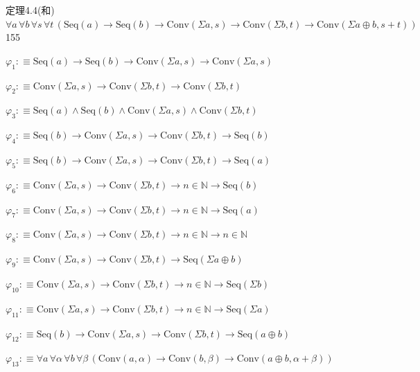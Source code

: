 \begin{fullproof}{定理4.4(和)}{$\forall a\,\forall b\,\forall s\,\forall t\,(\mathrm{Seq}(a) \to \mathrm{Seq}(b) \to \mathrm{Conv}(\Sigma a,s) \to \mathrm{Conv}(\Sigma b,t) \to \mathrm{Conv}(\Sigma a \oplus b,s + t))$}{155}
\begin{ptree}
\end{ptree}
\begin{abbrevlist}
\item $\varphi_{1} :\equiv \mathrm{Seq}(a) \to \mathrm{Seq}(b) \to \mathrm{Conv}(\Sigma a,s) \to \mathrm{Conv}(\Sigma a,s)$
\item $\varphi_{2} :\equiv \mathrm{Conv}(\Sigma a,s) \to \mathrm{Conv}(\Sigma b,t) \to \mathrm{Conv}(\Sigma b,t)$
\item $\varphi_{3} :\equiv \mathrm{Seq}(a) \land \mathrm{Seq}(b) \land \mathrm{Conv}(\Sigma a,s) \land \mathrm{Conv}(\Sigma b,t)$
\item $\varphi_{4} :\equiv \mathrm{Seq}(b) \to \mathrm{Conv}(\Sigma a,s) \to \mathrm{Conv}(\Sigma b,t) \to \mathrm{Seq}(b)$
\item $\varphi_{5} :\equiv \mathrm{Seq}(b) \to \mathrm{Conv}(\Sigma a,s) \to \mathrm{Conv}(\Sigma b,t) \to \mathrm{Seq}(a)$
\item $\varphi_{6} :\equiv \mathrm{Conv}(\Sigma a,s) \to \mathrm{Conv}(\Sigma b,t) \to n \in \mathbb{N} \to \mathrm{Seq}(b)$
\item $\varphi_{7} :\equiv \mathrm{Conv}(\Sigma a,s) \to \mathrm{Conv}(\Sigma b,t) \to n \in \mathbb{N} \to \mathrm{Seq}(a)$
\item $\varphi_{8} :\equiv \mathrm{Conv}(\Sigma a,s) \to \mathrm{Conv}(\Sigma b,t) \to n \in \mathbb{N} \to n \in \mathbb{N}$
\item $\varphi_{9} :\equiv \mathrm{Conv}(\Sigma a,s) \to \mathrm{Conv}(\Sigma b,t) \to \mathrm{Seq}(\Sigma a \oplus b)$
\item $\varphi_{10} :\equiv \mathrm{Conv}(\Sigma a,s) \to \mathrm{Conv}(\Sigma b,t) \to n \in \mathbb{N} \to \mathrm{Seq}(\Sigma b)$
\item $\varphi_{11} :\equiv \mathrm{Conv}(\Sigma a,s) \to \mathrm{Conv}(\Sigma b,t) \to n \in \mathbb{N} \to \mathrm{Seq}(\Sigma a)$
\item $\varphi_{12} :\equiv \mathrm{Seq}(b) \to \mathrm{Conv}(\Sigma a,s) \to \mathrm{Conv}(\Sigma b,t) \to \mathrm{Seq}(a \oplus b)$
\item $\varphi_{13} :\equiv \forall a\,\forall \alpha\,\forall b\,\forall \beta\,(\mathrm{Conv}(a,\alpha) \to \mathrm{Conv}(b,\beta) \to \mathrm{Conv}(a \oplus b,\alpha + \beta))$

\end{abbrevlist}
\end{fullproof}
